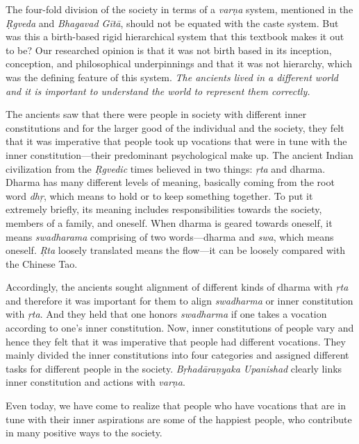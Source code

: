The four-fold division of the society in terms of a \textit{varṇa} system, mentioned in the \textit{Ṛgveda} and \textit{Bhagavad Gītā}, should not be equated with the caste system. But was this a birth-based rigid hierarchical system that this textbook makes it out to be? Our researched opinion is that it was not birth based in its inception, conception, and philosophical underpinnings and that it was not hierarchy, which was the defining feature of this system. \textit{The ancients lived in a different world and it is important to understand the world to represent them correctly.} 

The ancients saw that there were people in society with different inner constitutions and for the larger good of the individual and the society, they felt that it was imperative that people took up vocations that were in tune with the inner constitution—their predominant psychological make up. The ancient Indian civilization from the \textit{Ṛgvedic} times believed in two things: \textit{ŗta} and dharma. Dharma has many different levels of meaning, basically coming from the root word \textit{dhŗ},  which means to hold or to keep something together. To put it extremely briefly, its meaning includes responsibilities towards the society, members of a family, and oneself. When dharma is geared towards oneself, it means \textit{swadharama} comprising of two words—dharma and \textit{swa},  which means oneself. \textit{Ŗta} loosely translated means the flow—it can be loosely compared with the Chinese Tao. 

Accordingly, the ancients sought alignment of different kinds of dharma with \textit{ŗta} and therefore it was important for them to align \textit{swadharma} or inner constitution with \textit{ŗta}. And they held that one honors \textit{swadharma} if one takes a vocation according to one’s inner constitution. Now, inner constitutions of people vary and hence they felt that it was imperative that people had different vocations. They mainly divided the inner constitutions into four categories and assigned different tasks for different people in the society. \textit{Bṛhadāraṇyaka Upanishad} clearly links inner constitution and actions with \textit{varṇa}. 

Even today, we have come to realize that people who have vocations that are in tune with their inner aspirations are some of the happiest people, who contribute in many positive ways to the society. 

